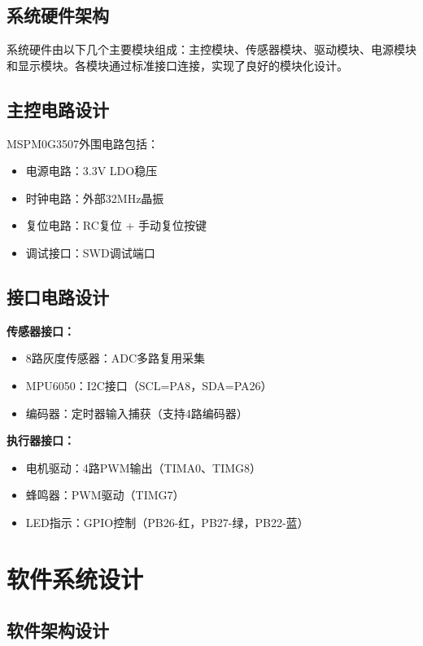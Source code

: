 \documentclass[UTF8]{ctexart}
\begin{document}
\subsection{系统硬件架构}

系统硬件由以下几个主要模块组成：主控模块、传感器模块、驱动模块、电源模块和显示模块。各模块通过标准接口连接，实现了良好的模块化设计。

\subsection{主控电路设计}

MSPM0G3507外围电路包括：
\begin{itemize}
    \item 电源电路：3.3V LDO稳压
    \item 时钟电路：外部32MHz晶振
    \item 复位电路：RC复位 + 手动复位按键
    \item 调试接口：SWD调试端口
\end{itemize}

\subsection{接口电路设计}

\textbf{传感器接口：}
\begin{itemize}
    \item 8路灰度传感器：ADC多路复用采集
    \item MPU6050：I2C接口（SCL=PA8，SDA=PA26）
    \item 编码器：定时器输入捕获（支持4路编码器）
\end{itemize}

\textbf{执行器接口：}
\begin{itemize}
    \item 电机驱动：4路PWM输出（TIMA0、TIMG8）
    \item 蜂鸣器：PWM驱动（TIMG7）
    \item LED指示：GPIO控制（PB26-红，PB27-绿，PB22-蓝）
\end{itemize}

\section{软件系统设计}

\subsection{软件架构设计}
\end{document}
